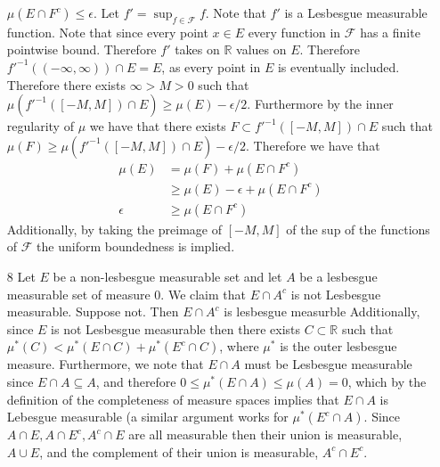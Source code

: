 \documentclass[12pt, letterpaper]{article}
\newcommand{\R}{\mathbb{R}}
\begin{document}
\begin{enumerate}
	$\mu(E \cap F^c) \leq \epsilon$.  Let 
	$f' = \sup_{f \in \mathcal{F}} f$.  Note that $f'$ is a Lesbesgue measurable 
	function.  Note that since every point $x \in E$ every function in $\mathcal{F}$
	has a finite pointwise bound.  Therefore $f'$ takes on $\R$ values on $E$.  
	Therefore $f'^{-1}((-\infty,\infty)) \cap E = E$, as every point in $E$ is 
	eventually included.  Therefore there exists $\infty > M > 0$ such that 
	$\mu(f'^{-1}([-M,M]) \cap E) \geq \mu(E) - \epsilon/2$.  Furthermore by the inner 
	regularity of $\mu$ we have that there exists $F \subset f'^{-1}([-M,M]) \cap E$
	such that $\mu(F) \geq \mu(f'^{-1}([-M,M]) \cap E) - \epsilon/2$.  Therefore we have that
	\begin{align*}
		\mu(E) &= \mu(F) + \mu(E \cap F^c)\\
		&\geq \mu(E) - \epsilon + \mu(E \cap F^c)\\
		\epsilon &\geq \mu(E \cap F^c)
	\end{align*}
	Additionally, by taking the preimage of $[-M,M]$ of the sup of the functions of 
	$\mathcal{F}$ the uniform boundedness is implied.  
	\item[8] Let $E$ be a non-lesbesgue measurable set and let $A$ be a lesbesgue measurable set of measure 0.  We claim that $E \cap A^c$ is not Lesbesgue measurable.
	Suppose not.  Then $E \cap A^c$ is lesbesgue measurble  Additionally, since $E$ is
	not Lesbesgue measurable then there exists $C \subset \R$ such that 
	$\mu^*(C) < \mu^*(E \cap C) + \mu^*(E^c \cap C)$, where $\mu^*$ is the outer lesbesgue measure.  Furthermore, we note that 
	$E \cap A$ must be Lesbesgue measurable since $E \cap A \subseteq A$, and therefore
	$0 \leq \mu^*(E \cap A) \leq \mu(A) = 0$, which by the definition of the completeness
	of measure spaces implies that $E\cap A$ is Lebesgue measurable (a similar 
	argument works for $\mu^*(E^c \cap A)$.  Since $A \cap E, A \cap E^c, A^c \cap E$
	are all measurable then their union is measurable, $A \cup E$, and the 
	complement of their union is measurable, $A^c \cap E^c$.  
	

\end{enumerate}
\end{document}
